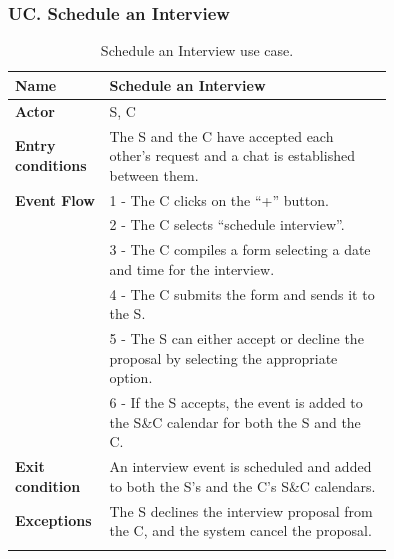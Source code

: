 \subsubsection*{UC\cuc . Schedule an Interview}
\begin{center}
    \begin{longtable}{|l|p{0.75\linewidth}|}
        \hline
        \textbf{Name}               & Schedule an Interview\\
        \hline
        \textbf{Actor}              & S, C\\
        \hline
        \textbf{Entry conditions}   & The S and the C have accepted each other’s request and a chat is established between them.\\
        \hline
        \textbf{Event Flow}         & 1 - The C clicks on the “+” button. \\
        & 2 - The C selects “schedule interview”. \\
        & 3 - The C compiles a form selecting a date and time for the interview. \\
        & 4 - The C submits the form and sends it to the S. \\
        & 5 - The S can either accept or decline the proposal by selecting the appropriate option. \\
        & 6 - If the S accepts, the event is added to the S\&C calendar for both the S and the C. \\
        \hline
        \textbf{Exit condition}   & An interview event is scheduled and added to both the S’s and the C’s S\&C calendars. \\       
        \hline
        \textbf{Exceptions}       & The S declines the interview proposal from the C, and the system cancel the proposal. \\
        \hline
        \caption{Schedule an Interview use case.}
        \label{tab: schedule_interview_use_case}
    \end{longtable}
\end{center}



